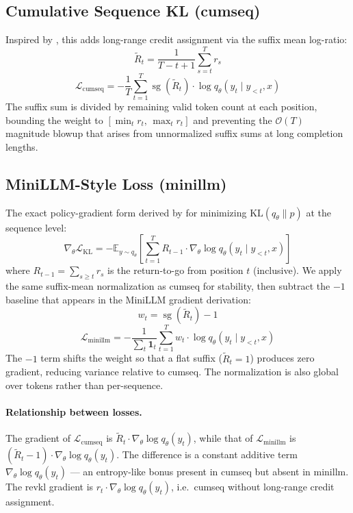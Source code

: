 \documentclass[11pt]{article}
\begin{document}
\subsection{Cumulative Sequence KL (cumseq)}

Inspired by \citet{cumseq2025}, this adds long-range credit assignment via the suffix mean log-ratio:
\begin{equation}
  \tilde{R}_t = \frac{1}{T - t + 1}\sum_{s=t}^{T} r_s
\end{equation}
\begin{equation}
  \mathcal{L}_{\text{cumseq}} = -\frac{1}{T}\sum_{t=1}^T \operatorname{sg}(\tilde{R}_t) \cdot \log q_\theta(y_t \mid y_{<t}, x)
\end{equation}
The suffix sum is divided by remaining valid token count at each position, bounding the weight to $[\min_t r_t,\, \max_t r_t]$ and preventing the $\mathcal{O}(T)$ magnitude blowup that arises from unnormalized suffix sums at long completion lengths.

\subsection{MiniLLM-Style Loss (minillm)}

The exact policy-gradient form derived by \citet{minillm2023} for minimizing $\mathrm{KL}(q_\theta \| p)$ at the sequence level:
\begin{equation}
  \nabla_\theta \mathcal{L}_{\mathrm{KL}} = -\mathbb{E}_{y \sim q_\theta}\left[\sum_{t=1}^T R_{t-1} \cdot \nabla_\theta \log q_\theta(y_t \mid y_{<t}, x)\right]
\end{equation}
where $R_{t-1} = \sum_{s \geq t} r_s$ is the return-to-go from position $t$ (inclusive). We apply the same suffix-mean normalization as cumseq for stability, then subtract the $-1$ baseline that appears in the MiniLLM gradient derivation:
\begin{equation}
  w_t = \operatorname{sg}(\tilde{R}_t) - 1
\end{equation}
\begin{equation}
  \mathcal{L}_{\text{minillm}} = -\frac{1}{\sum_t \mathbf{1}_t}\sum_{t=1}^T w_t \cdot \log q_\theta(y_t \mid y_{<t}, x)
\end{equation}
The $-1$ term shifts the weight so that a flat suffix ($\tilde{R}_t = 1$) produces zero gradient, reducing variance relative to cumseq. The normalization is also global over tokens rather than per-sequence.

\paragraph{Relationship between losses.}
The gradient of $\mathcal{L}_{\text{cumseq}}$ is $\tilde{R}_t \cdot \nabla_\theta \log q_\theta(y_t)$, while that of $\mathcal{L}_{\text{minillm}}$ is $(\tilde{R}_t - 1) \cdot \nabla_\theta \log q_\theta(y_t)$. The difference is a constant additive term $\nabla_\theta \log q_\theta(y_t)$ — an entropy-like bonus present in cumseq but absent in minillm. The revkl gradient is $r_t \cdot \nabla_\theta \log q_\theta(y_t)$, i.e.\ cumseq without long-range credit assignment.
\end{document}
